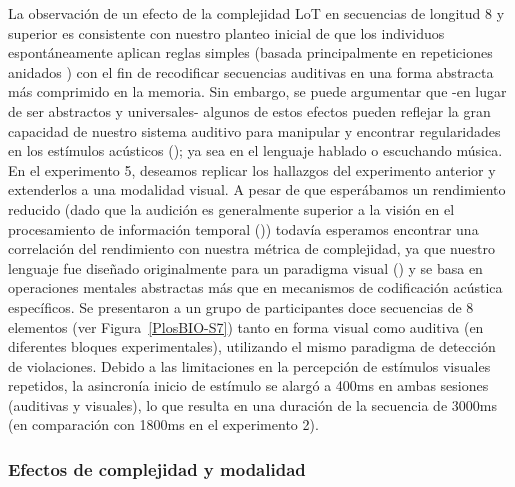 La observación de un efecto de la complejidad LoT en secuencias de longitud 8 y superior es consistente con nuestro planteo inicial de que los individuos espontáneamente aplican reglas simples (basada principalmente en repeticiones anidados ) con el fin de recodificar secuencias auditivas en una forma abstracta más comprimido en la memoria. Sin embargo, se puede argumentar que -en lugar de ser abstractos y universales- algunos de estos efectos pueden reflejar la gran capacidad de nuestro sistema auditivo para manipular y encontrar regularidades en los estímulos acústicos (\cite{f90}); ya sea en el lenguaje hablado o escuchando música. En el experimento 5, deseamos replicar los hallazgos del experimento anterior y extenderlos a una modalidad visual. A pesar de que esperábamos un rendimiento reducido (dado que la audición es generalmente superior a la visión en el procesamiento de información temporal (\cite{f91})) todavía esperamos encontrar una correlación del rendimiento con nuestra métrica de complejidad, ya que nuestro lenguaje fue diseñado originalmente para un paradigma visual (\cite{amalric2017language}) y se basa en operaciones mentales abstractas más que en mecanismos de codificación acústica específicos. Se presentaron a un grupo de participantes doce secuencias de 8 elementos (ver Figura~\ref{PlosBIO-S7}) tanto en forma visual como auditiva (en diferentes bloques experimentales), utilizando el mismo paradigma de detección de violaciones. Debido a las limitaciones en la percepción de estímulos visuales repetidos, la asincronía inicio de estímulo se alargó a 400ms en ambas sesiones (auditivas y visuales), lo que resulta en una duración de la secuencia de 3000ms (en comparación con 1800ms en el experimento 2).

\subsubsection{Efectos de complejidad y modalidad}


